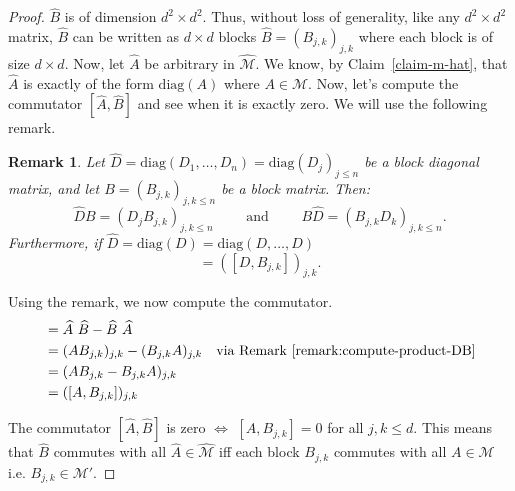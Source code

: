 \documentclass[12pt]{article}
\theoremstyle{plain}
\newtheorem{remark}[theorem]{Remark}
\begin{document}
\begin{proof}
    $\widehat{B}$ is of dimension $d^2 \times d^2$. Thus, without loss of generality, like any $d^2 \times d^2$ matrix, $\widehat{B}$ can be written as $d \times d$ blocks $\widehat{B} = (B_{j,k})_{j,k}$ where each block is of size $d \times d$. Now, let $\widehat{A}$ be arbitrary in $\widehat{\mathcal{M}}$. We know, by Claim~\ref{claim-m-hat}, that $\widehat{A}$ is exactly of the form $\text{diag}(A)$ where $A \in \mathcal{M}$. Now, let's compute the commutator $[\widehat{A}, \widehat{B}]$ and see when it is exactly zero. We will use the following remark.

    \begin{remark}\label{remark:compute-product-DB}
        Let $\widehat{D} = \text{diag}(D_1, \dots, D_n) = \text{diag}(D_j)_{j \leq n}$ be a block diagonal matrix, and let $B = \left(B_{j,k}\right)_{j,k \leq n}$ be a block matrix. Then:
        \begin{equation}
            \widehat{D}B = \left(D_j B_{j,k}\right)_{j,k \leq n} \quad\quad \text{ and } \quad\quad B\widehat{D} = \left(B_{j,k}D_k \right)_{j,k \leq n}.
        \end{equation}
         Furthermore, if  $\widehat{D} = \text{diag}(D) = \text{diag}(D, \dots, D)$
         \begin{equation}
             [\widehat{D}, B] = \left([D, B_{j,k}]\right)_{j,k}.
         \end{equation}
    \end{remark}
\noindent Using the remark, we now compute the commutator.
    \begin{align*}
        [\widehat{A}, \widehat{B}] &= \widehat{A} \ \widehat{B} - \widehat{B} \ \widehat{A}\\
        &= (A B_{j,k})_{j,k} - (B_{j,k} A)_{j,k} & \text{via Remark~\ref{remark:compute-product-DB}}\\
        &= (A B_{j,k} - B_{j,k} A)_{j,k}\\
        &= ([A, B_{j,k}])_{j,k}
    \end{align*}

\noindent The commutator $[\widehat{A}, \widehat{B}]$ is zero $\iff$ $[A, B_{j,k}] = 0$ for all $j, k \leq d$. This means that $\widehat{B}$ commutes with all $\widehat{A} \in \widehat{\mathcal{M}}$ iff each block $B_{j,k}$ commutes with all $A \in \mathcal{M}$ i.e. $B_{j,k} \in \mathcal{M}'$.
    

\end{proof}
\end{document}
